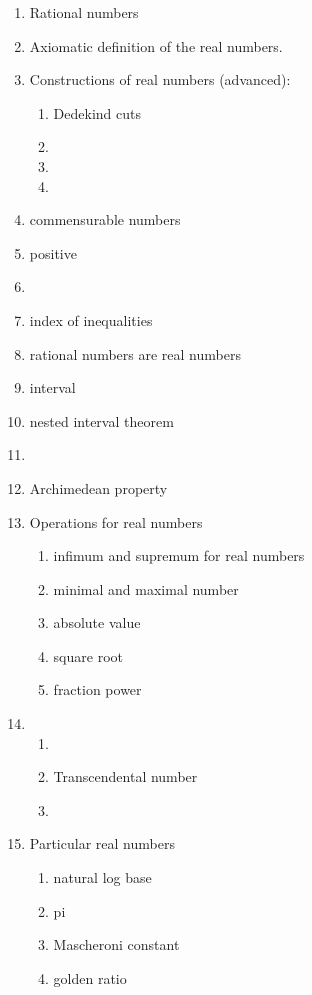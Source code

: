 \documentclass[12pt]{article}
\begin{document}
\begin{enumerate}
\item Rational numbers
\item Axiomatic definition of the real numbers. 
\item Constructions of real numbers (advanced):
   \begin{enumerate}
   \item Dedekind cuts
   \item {}
   \item {}
   \item {}
   \end{enumerate}
\item commensurable numbers
\item positive
\item {}
\item index of inequalities
\item rational numbers are real numbers 
\item interval
\item nested interval theorem
\item {}

\item Archimedean property
\item Operations for real numbers
   \begin{enumerate}
   \item infimum and supremum for real numbers
   \item minimal and maximal number
   \item absolute value
   \item square root
   \item fraction power
   \end{enumerate}
\item {}
   \begin{enumerate}
   \item {}
   \item Transcendental number
   \item {}
   \end{enumerate}
\item Particular real numbers
 \begin{enumerate}
 \item natural log base
 \item pi
 \item Mascheroni constant
 \item golden ratio
 \end{enumerate}

\end{enumerate}
\end{document}
